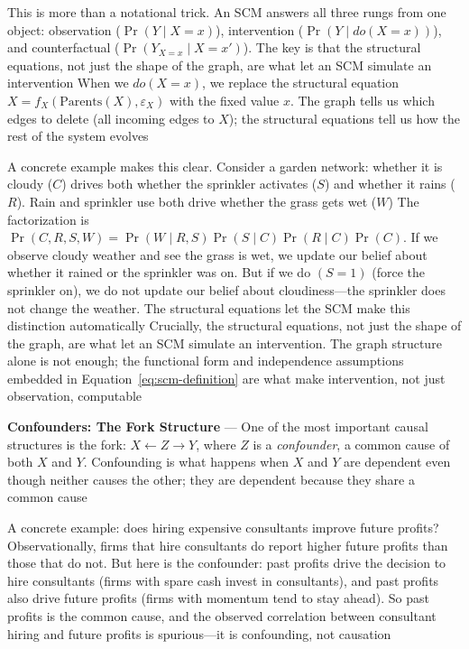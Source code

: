 This is more than a notational trick. An SCM answers all three rungs from one object:
observation ($\Pr(Y \mid X = x)$), intervention ($\Pr(Y \mid do(X = x))$), and
counterfactual ($\Pr(Y_{X=x}\mid X = x')$). The key is that the structural equations,
not just the shape of the graph, are what let an SCM simulate an intervention
When we $do(X = x)$, we replace the structural equation $X = f_{X}(\text{Parents}
(X), \varepsilon_{X})$ with the fixed value $x$. The graph tells us which edges
to delete (all incoming edges to $X$); the structural equations tell us how the rest
of the system evolves

A concrete example makes this clear. Consider a garden network: whether it is
cloudy ($C$) drives both whether the sprinkler activates ($S$) and whether it
rains ($R$). Rain and sprinkler use both drive whether the grass gets wet ($W$) The
factorization is $\Pr(C, R, S, W) = \Pr(W \mid R, S) \Pr(S \mid C) \Pr(R \mid C)
\Pr(C)$. If we observe cloudy weather and see the grass is wet, we update our belief
about whether it rained or the sprinkler was on. But if we do $(S = 1)$ (force the
sprinkler on), we do not update our belief about cloudiness—the sprinkler does not
change the weather. The structural equations let the SCM make this distinction
automatically Crucially, the structural equations, not just the shape of the
graph, are what let an SCM simulate an intervention. The graph structure alone
is not enough; the functional form and independence assumptions embedded in Equation~\eqref{eq:scm-definition}
are what make intervention, not just observation, computable


\textbf{Confounders: The Fork Structure} --- One of the most important causal structures
is the fork: $X \leftarrow Z \rightarrow Y$, where $Z$ is a \emph{confounder}, a
common cause of both $X$ and $Y$. Confounding is what happens when $X$ and $Y$
are dependent even though neither causes the other; they are dependent because they
share a common cause

A concrete example: does hiring expensive consultants improve future profits?
Observationally, firms that hire consultants do report higher future profits than
those that do not. But here is the confounder: past profits drive the decision to
hire consultants (firms with spare cash invest in consultants), and past profits
also drive future profits (firms with momentum tend to stay ahead). So past profits
is the common cause, and the observed correlation between consultant hiring and
future profits is spurious—it is confounding, not causation

